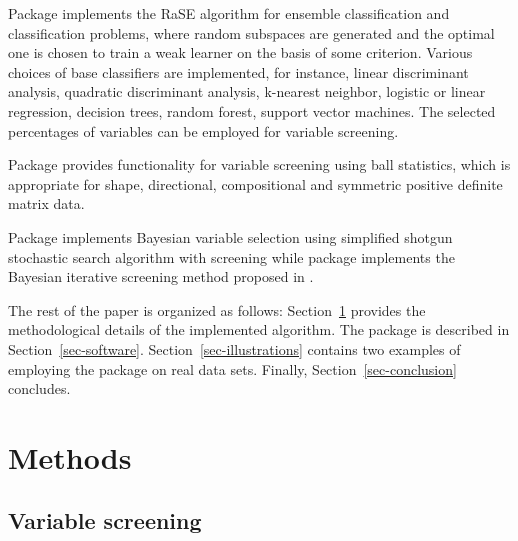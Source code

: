 \documentclass[
  article]{jss}
\begin{document}
Package  \citep{pkg:RaSEn} implements the RaSE algorithm for
ensemble classification and classification problems, where random
subspaces are generated and the optimal one is chosen to train a weak
learner on the basis of some criterion. Various choices of base
classifiers are implemented, for instance, linear discriminant analysis,
quadratic discriminant analysis, k-nearest neighbor, logistic or linear
regression, decision trees, random forest, support vector machines. The
selected percentages of variables can be employed for variable
screening.

Package  \citep{pkg:ball} provides functionality for variable
screening using ball statistics, which is appropriate for shape,
directional, compositional and symmetric positive definite matrix data.

Package  \citep{pkg:BayesS5} implements Bayesian variable
selection using simplified shotgun stochastic search algorithm with
screening \citep{shin2017scalablebayesianvariableselection} while
package  \citep{pkg:bravo} implements the Bayesian iterative
screening method proposed in
\citep{wang2021bayesianiterativescreeningultrahigh}.

The rest of the paper is organized as follows: Section~\ref{sec-models}
provides the methodological details of the implemented algorithm. The
package is described in Section~\ref{sec-software}.
Section~\ref{sec-illustrations} contains two examples of employing the
package on real data sets. Finally, Section~\ref{sec-conclusion}
concludes.

\section{Methods}\label{sec-models}

\subsection{Variable screening}\label{variable-screening}
\end{document}
